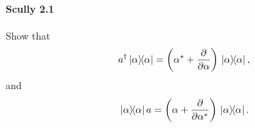 \documentclass[hyperref, a4paper]{article}
\begin{document}
\paragraph{}

\paragraph{Scully 2.1} Show that
\begin{equation}
    a^\dagger \dyad*{\alpha} = \left( \alpha^{*}+\frac{\partial}{\partial \alpha} \right) \dyad*{\alpha},
    \label{eq:scully-2-1-1}
\end{equation}
and
\begin{equation}
    \dyad*{\alpha} a = \left(\alpha+\frac{\partial}{\partial \alpha^{*}}\right) \dyad*{\alpha}.
    \label{eq:scully-2-1-2}
\end{equation}
\end{document}
